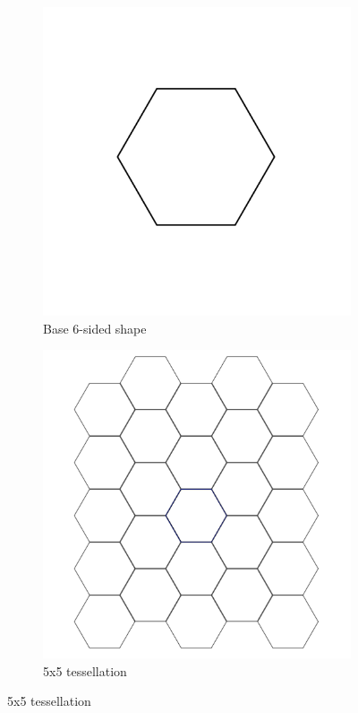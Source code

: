 \documentclass[12pt,letterpaper]{article}
\begin{document}
\begin{figure}[H]
    \begin{center}
        \caption{Tessellation of a hexagon, also known as a honeycomb $\{6,3\}$}
        \label{fig:hex}
        \begin{subfigure}[b]{.3\linewidth}
            \includegraphics[width=\linewidth]{base-hex}
            \caption{Base 6-sided shape}
        \end{subfigure}
        \begin{subfigure}[b]{.3\linewidth}
            \includegraphics[width=\linewidth]{tes-hex}
            \caption{5x5 tessellation}
        \end{subfigure}
    \end{center}
\end{figure}
\end{document}
